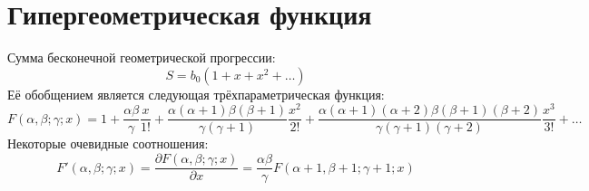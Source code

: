 \section{Гипергеометрическая функция}

Сумма бесконечной геометрической прогрессии:
\[
	S = b_0(1 + x + x^2 + \ldots)
\]
Её обобщением является следующая трёхпараметрическая функция:
\[
	F(\alpha, \beta; \gamma; x) = 
	1+
	\frac{\alpha \beta}{\gamma} \frac{x}{1!} + 
	\frac{\alpha(\alpha + 1) \beta (\beta + 1)}{\gamma (\gamma + 1)} \frac{x^2}{2!} +
	\frac{\alpha(\alpha + 1)(\alpha + 2) \beta (\beta + 1)(\beta + 2)}{\gamma (\gamma + 1)(\gamma + 2)} \frac{x^3}{3!} +
	\ldots
\]
Некоторые очевидные соотношения:
\[
	F'(\alpha, \beta; \gamma; x) = 
	\frac{\partial F(\alpha, \beta; \gamma; x)}{\partial x} = 
	\frac{\alpha \beta}{\gamma} F(\alpha+1, \beta + 1; \gamma + 1; x)
\]